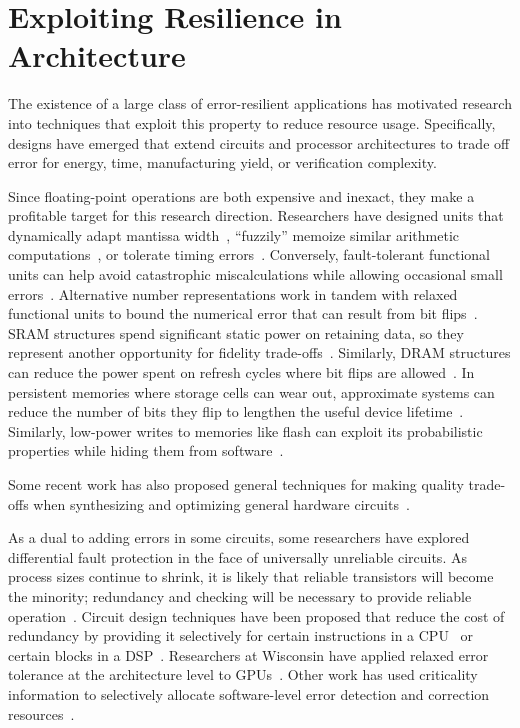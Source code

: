 \section{Exploiting Resilience in Architecture}

The existence of a large class of error-resilient applications has motivated
research into techniques that exploit this property to reduce resource usage.
Specifically, designs have emerged that extend circuits and processor
architectures to trade off error for energy, time, manufacturing yield, or
verification complexity.

Since floating-point operations are both expensive and inexact, they make a
profitable target for this research direction. Researchers have designed units
that dynamically adapt mantissa width~\cite{bitwidthred, hierarchfpu}, ``fuzzily'' memoize
similar arithmetic computations~\cite{fuzzymemo}, or tolerate timing
errors~\cite{palem-adders, impact, kumarhpca, hizli, adder-metrics}.
Conversely, fault-tolerant functional units can help avoid catastrophic
miscalculations while allowing occasional small errors~\cite{uva-adder}.
Alternative number
representations work in tandem with relaxed functional units to bound the
numerical error that can result from bit flips~\cite{stanleymarbell}. SRAM
structures spend significant static power on retaining data, so they represent
another opportunity for fidelity trade-offs~\cite{hybrid-sram}. Similarly,
DRAM structures can reduce the power spent on refresh cycles where bit flips
are allowed~\cite{flikker, sparkk}.
In persistent memories where storage cells can wear out, approximate systems
can reduce the number of bits they flip to lengthen the useful device
lifetime~\cite{fang-pcm}.
Similarly, low-power writes to memories like flash can exploit its
probabilistic properties while hiding them from software~\cite{halfwits,
powerfade, flash-retention-relax}.

Some recent work has also proposed general techniques for making quality trade-offs
when synthesizing and optimizing general hardware
circuits~\cite{lossysynthesis, palem-pruning, rahimi, axilog, miao-thesis}.

As a dual to adding errors in some circuits, some researchers have
explored differential fault protection in the face of universally unreliable
circuits. As process sizes continue to shrink, it is likely that reliable
transistors will become the minority; redundancy and checking will be
necessary to provide reliable operation~\cite{li-asplos08}. Circuit design
techniques have been proposed that reduce the cost of redundancy by providing
it selectively for certain instructions in a CPU~\cite{wreft} or certain
blocks in a DSP~\cite{unequal-protection, ant}.
Researchers at Wisconsin have applied relaxed error tolerance at the
architecture level to GPUs~\cite{palframan-gpu}.
Other work has used criticality information to selectively allocate
software-level error detection and correction
resources~\cite{khudia-tolerance, shi-cal}.

